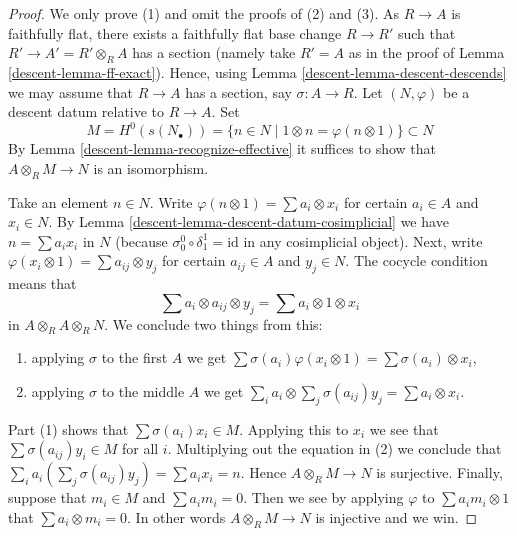 \begin{proof}

We only prove (1) and omit the proofs of (2) and (3).
As $R \to A$ is faithfully flat, there exists a faithfully flat
base change $R \to R'$ such that $R' \to A' = R' \otimes_R A$ has
a section (namely take $R' = A$ as in the proof of
Lemma \ref{descent-lemma-ff-exact}). Hence, using
Lemma \ref{descent-lemma-descent-descends}
we may assume that $R \to A$ has a section, say $\sigma : A \to R$.
Let $(N, \varphi)$ be a descent datum relative to $R \to A$.
Set
$$
M = H^0(s(N_\bullet)) = \{n \in N \mid 1 \otimes n = \varphi(n \otimes 1)\}
\subset
N
$$
By Lemma \ref{descent-lemma-recognize-effective} it suffices to show that
$A \otimes_R M \to N$ is an isomorphism.

\medskip\noindent
Take an element $n \in N$. Write
$\varphi(n \otimes 1) = \sum a_i \otimes x_i$ for certain
$a_i \in A$ and $x_i \in N$. By Lemma \ref{descent-lemma-descent-datum-cosimplicial}
we have $n = \sum a_i x_i$ in $N$ (because
$\sigma^0_0 \circ \delta^1_1 = \text{id}$ in any cosimplicial object).
Next, write $\varphi(x_i \otimes 1) = \sum a_{ij} \otimes y_j$ for
certain $a_{ij} \in A$ and $y_j \in N$.
The cocycle condition means that
$$
\sum a_i \otimes a_{ij} \otimes y_j = \sum a_i \otimes 1 \otimes x_i
$$
in $A \otimes_R A \otimes_R N$. We conclude two things from this:
\begin{enumerate}
\item applying $\sigma$ to the first $A$ we get
$\sum \sigma(a_i) \varphi(x_i \otimes 1) = \sum \sigma(a_i) \otimes x_i$,
\item applying $\sigma$ to the middle $A$ we get
$\sum_i a_i \otimes \sum_j \sigma(a_{ij}) y_j = \sum a_i \otimes x_i$.
\end{enumerate}
Part (1) shows that $\sum \sigma(a_i) x_i \in M$. Applying this to
$x_i$ we see that $\sum \sigma(a_{ij})y_i \in M$ for all $i$.
Multiplying out the equation in (2) we conclude that
$\sum_i a_i (\sum_j \sigma(a_{ij}) y_j) = \sum a_i x_i = n$.
Hence $A \otimes_R M \to N$ is surjective.
Finally, suppose that $m_i \in M$ and $\sum a_i m_i = 0$.
Then we see by applying $\varphi$ to
$\sum a_im_i \otimes 1$ that $\sum a_i \otimes m_i = 0$.
In other words $A \otimes_R M \to N$ is injective and we win.
\end{proof}

